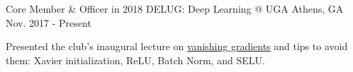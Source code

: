 \begin{cventries}

\cventry
{Core Member \& Officer in 2018}
{DELUG: Deep Learning @ UGA}
{Athens, GA}
{Nov. 2017 - Present}
{\begin{cvitems}
    \item {Presented the club's inaugural lecture on \underline{\href{https://goo.gl/B7x3YF}{vanishing gradients}} and tips to avoid them: Xavier initialization, ReLU, Batch Norm, and SELU.}
\end{cvitems}}

\end{cventries}
